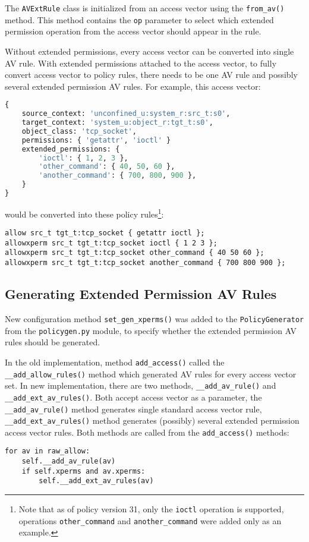 The \texttt{AVExtRule} class is initialized from an access vector using the
\texttt{from\_av()} method. This method contains the \texttt{op} parameter to
select which extended permission operation from the access vector should appear
in the rule.

Without extended permissions, every access vector can be converted into single
AV rule. With extended permissions attached to the access vector, to fully
convert access vector to policy rules, there needs to be one AV rule and
possibly several extended permission AV rules. For example, this access vector:
\begin{lstlisting}[language=Python]
{
    source_context: 'unconfined_u:system_r:src_t:s0',
    target_context: 'system_u:object_r:tgt_t:s0',
    object_class: 'tcp_socket',
    permissions: { 'getattr', 'ioctl' }
    extended_permissions: {
        'ioctl': { 1, 2, 3 },
        'other_command': { 40, 50, 60 },
        'another_command': { 700, 800, 900 },
    }
}
\end{lstlisting}
would be converted into these policy rules\footnote{Note that as of policy
version 31, only the \texttt{ioctl} operation is supported, operations
\texttt{other\_command} and \texttt{another\_command} were added only as an
example.}:
\begin{lstlisting}
allow src_t tgt_t:tcp_socket { getattr ioctl };
allowxperm src_t tgt_t:tcp_socket ioctl { 1 2 3 };
allowxperm src_t tgt_t:tcp_socket other_command { 40 50 60 };
allowxperm src_t tgt_t:tcp_socket another_command { 700 800 900 };
\end{lstlisting}

\subsection{Generating Extended Permission AV Rules}
New configuration method \texttt{set\_gen\_xperms()} was added to the
\texttt{PolicyGenerator} from the \texttt{policygen.py} module, to specify
whether the extended permission AV rules should be generated.

In the old implementation, method \texttt{add\_access()} called the
\texttt{\_\_add\_allow\_rules()} method which generated AV rules for every
access vector set. In new implementation, there are two methods,
\texttt{\_\_add\_av\_rule()} and \texttt{\_\_add\_ext\_av\_rules()}. Both accept
access vector as a parameter, the \texttt{\_\_add\_av\_rule()} method generates
single standard access vector rule, \texttt{\_\_add\_ext\_av\_rules()} method
generates (possibly) several extended permission access vector rules. Both
methods are called from the \texttt{add\_access()} methods:
\begin{lstlisting}
for av in raw_allow:
    self.__add_av_rule(av)
    if self.xperms and av.xperms:
        self.__add_ext_av_rules(av)
\end{lstlisting}


